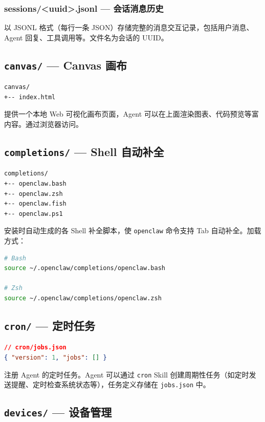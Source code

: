 \subsubsection{sessions/<uuid>.jsonl --- 会话消息历史}


以 JSONL 格式（每行一条 JSON）存储完整的消息交互记录，包括用户消息、Agent 回复、工具调用等。文件名为会话的 UUID。

\subsection{\texttt{canvas/} --- Canvas 画布}


\begin{lstlisting}
canvas/
+-- index.html
\end{lstlisting}

提供一个本地 Web 可视化画布页面，Agent 可以在上面渲染图表、代码预览等富内容。通过浏览器访问。

\subsection{\texttt{completions/} --- Shell 自动补全}


\begin{lstlisting}
completions/
+-- openclaw.bash
+-- openclaw.zsh
+-- openclaw.fish
+-- openclaw.ps1
\end{lstlisting}

安装时自动生成的各 Shell 补全脚本，使 \texttt{openclaw} 命令支持 Tab 自动补全。加载方式：

\begin{lstlisting}[language=bash]
# Bash
source ~/.openclaw/completions/openclaw.bash

# Zsh
source ~/.openclaw/completions/openclaw.zsh
\end{lstlisting}

\subsection{\texttt{cron/} --- 定时任务}


\begin{lstlisting}[language=json]
// cron/jobs.json
{ "version": 1, "jobs": [] }
\end{lstlisting}

注册 Agent 的定时任务。Agent 可以通过 \texttt{cron} Skill 创建周期性任务（如定时发送提醒、定时检查系统状态等），任务定义存储在 \texttt{jobs.json} 中。

\subsection{\texttt{devices/} --- 设备管理}


